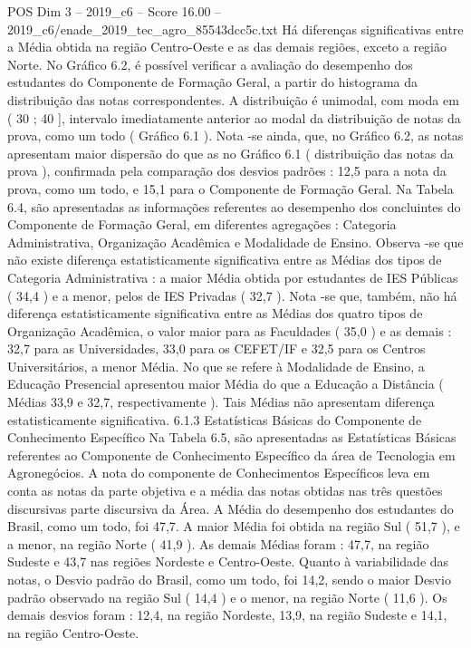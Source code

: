 \begin{textsample}{POS Dim 3 – 2019\_c6 – Score 16.00 – 2019\_c6/enade\_2019\_tec\_agro\_85543dcc5c.txt}
Há diferenças significativas entre a Média obtida na região Centro-Oeste e as das demais regiões, exceto a região Norte.
No Gráfico 6.2, é possível verificar a avaliação do desempenho dos estudantes do Componente de Formação Geral, a partir do histograma da distribuição das notas correspondentes.
A distribuição é unimodal, com moda em ( 30 ; 40 ], intervalo imediatamente anterior ao modal da distribuição de notas da prova, como um todo ( Gráfico 6.1 ).
Nota -se ainda, que, no Gráfico 6.2, as notas apresentam maior dispersão do que as no Gráfico 6.1 ( distribuição das notas da prova ), confirmada pela comparação dos desvios padrões : 12,5 para a nota da prova, como um todo, e 15,1 para o Componente de Formação Geral.
Na Tabela 6.4, são apresentadas as informações referentes ao desempenho dos concluintes do Componente de Formação Geral, em diferentes agregações : Categoria Administrativa, Organização Acadêmica e Modalidade de Ensino.
Observa -se que não existe diferença estatisticamente significativa entre as Médias dos tipos de Categoria Administrativa : a maior Média obtida por estudantes de IES Públicas ( 34,4 ) e a menor, pelos de IES Privadas ( 32,7 ).
Nota -se que, também, não há diferença estatisticamente significativa entre as Médias dos quatro tipos de Organização Acadêmica, o valor maior para as Faculdades ( 35,0 ) e as demais : 32,7 para as Universidades, 33,0 para os CEFET/IF e 32,5 para os Centros Universitários, a menor Média.
No que se refere à Modalidade de Ensino, a Educação Presencial apresentou maior Média do que a Educação a Distância ( Médias 33,9 e 32,7, respectivamente ).
Tais Médias não apresentam diferença estatisticamente significativa. 6.1.3 Estatísticas Básicas do Componente de Conhecimento Específico Na Tabela 6.5, são apresentadas as Estatísticas Básicas referentes ao Componente de Conhecimento Específico da área de Tecnologia em Agronegócios.
A nota do componente de Conhecimentos Específicos leva em conta as notas da parte objetiva e a média das notas obtidas nas três questões discursivas parte discursiva da Área.
A Média do desempenho dos estudantes do Brasil, como um todo, foi 47,7.
A maior Média foi obtida na região Sul ( 51,7 ), e a menor, na região Norte ( 41,9 ).
As demais Médias foram : 47,7, na região Sudeste e 43,7 nas regiões Nordeste e Centro-Oeste.
Quanto à variabilidade das notas, o Desvio padrão do Brasil, como um todo, foi 14,2, sendo o maior Desvio padrão observado na região Sul ( 14,4 ) e o menor, na região Norte ( 11,6 ).
Os demais desvios foram : 12,4, na região Nordeste, 13,9, na região Sudeste e 14,1, na região Centro-Oeste.

\end{textsample}
